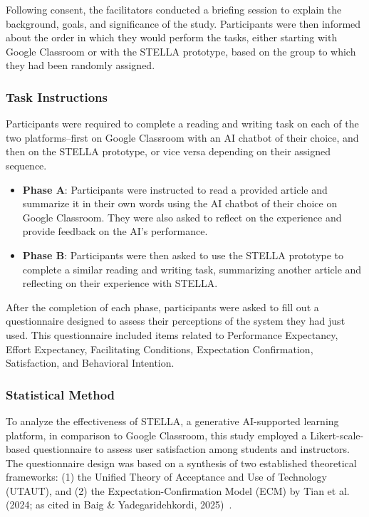\documentclass[sigconf,natbib=true]{acmart}
\begin{document}
Following consent, the facilitators conducted a briefing session to explain the background, goals, and significance of the study. Participants were then informed about the order in which they would perform the tasks, either starting with Google Classroom or with the STELLA prototype, based on the group to which they had been randomly assigned.

\subsubsection{Task Instructions}
Participants were required to complete a reading and writing task on each of the two platforms–first on Google Classroom with an AI chatbot of their choice, and then on the STELLA prototype, or vice versa depending on their assigned sequence.
\begin{itemize}
  \item \textbf{Phase A}\@: Participants were instructed to read a provided article and summarize it in their own words using the AI chatbot of their choice on Google Classroom. They were also asked to reflect on the experience and provide feedback on the AI's performance.
  \item \textbf{Phase B}\@: Participants were then asked to use the STELLA prototype to complete a similar reading and writing task, summarizing another article and reflecting on their experience with STELLA\@.
\end{itemize}
 After the completion of each phase, participants were asked to fill out a questionnaire designed to assess their perceptions of the system they had just used. This questionnaire included items related to Performance Expectancy, Effort Expectancy, Facilitating Conditions, Expectation Confirmation, Satisfaction, and Behavioral Intention.

 \subsubsection{Statistical Method}
To analyze the effectiveness of STELLA, a generative AI-supported learning
 platform, in comparison to Google Classroom, this study employed a
 Likert-scale-based questionnaire to assess user satisfaction among students and
 instructors. The questionnaire design was based on a synthesis of two
 established theoretical frameworks: (1) the Unified Theory of Acceptance and
 Use of Technology (UTAUT), and (2) the Expectation-Confirmation Model (ECM) by
 Tian et al. (2024; as cited in Baig \& Yadegaridehkordi, 2025)~\cite{tianAIChatbotsChinese2024a, baigFactorsInfluencingAcademic2025}.
\end{document}
